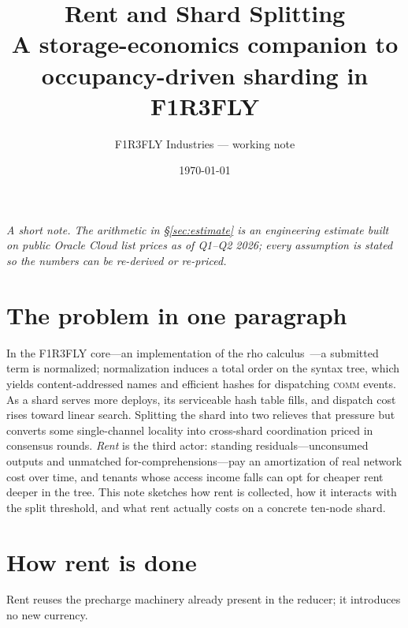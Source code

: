 \documentclass[11pt]{article}
\title{\color{f1r3red}\bfseries Rent and Shard Splitting\\[2pt]
\large\color{f1r3ink}\mdseries A storage-economics companion to occupancy-driven sharding in F1R3FLY}
\author{\normalsize F1R3FLY Industries --- working note}
\date{\normalsize \today}
\begin{document}
\maketitle

\noindent\textit{A short note. The arithmetic in \S\ref{sec:estimate} is an engineering estimate built on public Oracle Cloud list prices as of Q1--Q2 2026; every assumption is stated so the numbers can be re-derived or re-priced.}

\section{The problem in one paragraph}

In the F1R3FLY core---an implementation of the rho calculus~\cite{rho2005}---a submitted term is normalized; normalization induces a total order on the syntax tree, which yields content-addressed names and efficient hashes for dispatching \textsc{comm} events. As a shard serves more deploys, its serviceable hash table fills, and dispatch cost rises toward linear search. Splitting the shard into two relieves that pressure but converts some single-channel locality into cross-shard coordination priced in consensus rounds. \emph{Rent} is the third actor: standing residuals---unconsumed outputs and unmatched for-comprehensions---pay an amortization of real network cost over time, and tenants whose access income falls can opt for cheaper rent deeper in the tree. This note sketches how rent is collected, how it interacts with the split threshold, and what rent actually costs on a concrete ten-node shard.

\section{How rent is done}
\label{sec:rent}

Rent reuses the precharge machinery already present in the reducer; it introduces no new currency.
\end{document}
